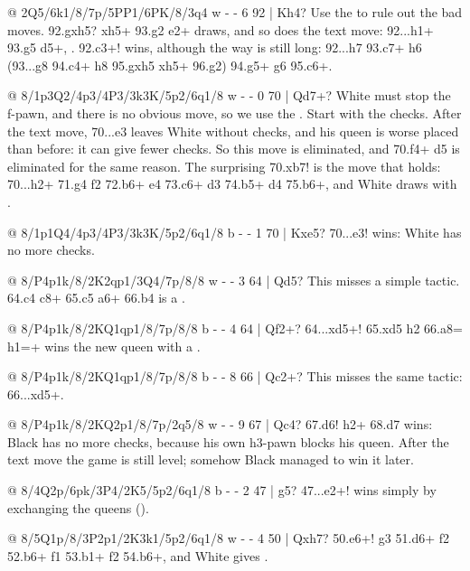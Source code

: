 @ 2Q5/6k1/8/7p/5PP1/6PK/8/3q4 w - - 6 92 | Kh4?
Use the  to rule out the
bad moves. 92.gxh5? \Q xh5+ 93.\K g2 \Q e2+ draws, and so does the text move: 92...\Q h1+ 93.\K g5
\Q d5+, . 92.\Q c3+! wins, although the way is still long:
92...\K h7 93.\Q c7+ \K h6 (93...\K g8 94.\Q c4+ \K h8 95.gxh5 \Q xh5+ 96.\K g2) 94.g5+ \K g6
95.\Q c6+.

@ 8/1p3Q2/4p3/4P3/3k3K/5p2/6q1/8 w - - 0 70 | Qd7+?
White must stop the f-pawn, and there is no obvious move, so we use the
. Start with the checks.
After the text move, 70...\K e3 leaves White without checks, and his queen is worse placed than
before: it can give fewer checks. So this move is eliminated, and 70.\Q f4+ \K d5 is eliminated for
the same reason. The surprising 70.\Q xb7! is the move that holds: 70...\Q h2+ 71.\K g4 f2
72.\Q b6+ \K e4 73.\Q c6+ \K d3 74.\Q b5+ \K d4 75.\Q b6+, and White draws with .

@ 8/1p1Q4/4p3/4P3/3k3K/5p2/6q1/8 b - - 1 70 | Kxe5?
70...\K e3! wins: White has no more checks.

@ 8/P4p1k/8/2K2qp1/3Q4/7p/8/8 w - - 3 64 | Qd5?
This misses a simple tactic. 64.\K c4 \Q c8+ 65.\Q c5 \Q a6+ 66.\K b4 is a .

@ 8/P4p1k/8/2KQ1qp1/8/7p/8/8 b - - 4 64 | Qf2+?
64...\Q xd5+! 65.\K xd5 h2 66.a8=\Q{} h1=\Q+ wins the new queen with a
.


@ 8/P4p1k/8/2KQ1qp1/8/7p/8/8 b - - 8 66 | Qc2+?
This misses the same tactic: 66...\Q xd5+.

@ 8/P4p1k/8/2KQ2p1/8/7p/2q5/8 w - - 9 67 | Qc4?
67.\K d6! \Q h2+ 68.\K d7 wins: Black has no more checks, because his own h3-pawn blocks his queen.
After the text move the game is still level; somehow Black managed to win it later.

@ 8/4Q2p/6pk/3P4/2K5/5p2/6q1/8 b - - 2 47 | g5?
47...\Q e2+! wins simply by exchanging the queens ().

@ 8/5Q1p/8/3P2p1/2K3k1/5p2/6q1/8 w - - 4 50 | Qxh7?
50.\Q e6+! \K g3 51.\Q d6+ \K f2 52.\Q b6+ \K f1 53.\Q b1+ \K f2 54.\Q b6+, and White gives .

